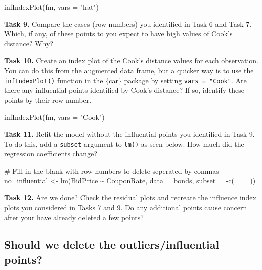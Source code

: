\documentclass[
  letterpaper,
  DIV=11,
  numbers=noendperiod]{scrartcl}
\newenvironment{Shaded}{\begin{snugshade}}{\end{snugshade}}
\newcommand{\AttributeTok}[1]{\textcolor[rgb]{0.40,0.45,0.13}{#1}}
\newcommand{\CommentTok}[1]{\textcolor[rgb]{0.37,0.37,0.37}{#1}}
\newcommand{\FunctionTok}[1]{\textcolor[rgb]{0.28,0.35,0.67}{#1}}
\newcommand{\NormalTok}[1]{\textcolor[rgb]{0.00,0.23,0.31}{#1}}
\newcommand{\OtherTok}[1]{\textcolor[rgb]{0.00,0.23,0.31}{#1}}
\newcommand{\SpecialCharTok}[1]{\textcolor[rgb]{0.37,0.37,0.37}{#1}}
\newcommand{\StringTok}[1]{\textcolor[rgb]{0.13,0.47,0.30}{#1}}
\begin{document}
\begin{Shaded}
\begin{Highlighting}[]
\FunctionTok{infIndexPlot}\NormalTok{(fm, }\AttributeTok{vars =} \StringTok{"hat"}\NormalTok{)}
\end{Highlighting}
\end{Shaded}

\textbf{Task 9.} Compare the cases (row numbers) you identified in Task
6 and Task 7. Which, if any, of these points to you expect to have high
values of Cook's distance? Why?

\textbf{Task 10.} Create an index plot of the Cook's distance values for
each observation. You can do this from the augmented data frame, but a
quicker way is to use the \texttt{infIndexPlot()} function in the
\{car\} package by setting \texttt{vars\ =\ "Cook"}. Are there any
influential points identified by Cook's distance? If so, identify these
points by their row number.

\begin{Shaded}
\begin{Highlighting}[]
\FunctionTok{infIndexPlot}\NormalTok{(fm, }\AttributeTok{vars =} \StringTok{"Cook"}\NormalTok{)}
\end{Highlighting}
\end{Shaded}

\textbf{Task 11.} Refit the model without the influential points you
identified in Task 9. To do this, add a \texttt{subset} argument to
\texttt{lm()} as seen below. How much did the regression coefficients
change?

\begin{Shaded}
\begin{Highlighting}[]
\CommentTok{\# Fill in the blank with row numbers to delete seperated by commas}
\NormalTok{no\_influential }\OtherTok{\textless{}{-}} \FunctionTok{lm}\NormalTok{(BidPrice }\SpecialCharTok{\textasciitilde{}}\NormalTok{ CouponRate, }\AttributeTok{data =}\NormalTok{ bonds, }\AttributeTok{subset =} \SpecialCharTok{{-}}\FunctionTok{c}\NormalTok{(\_\_\_))}
\end{Highlighting}
\end{Shaded}

\textbf{Task 12.} Are we done? Check the residual plots and recreate the
influence index plots you considered in Tasks 7 and 9. Do any additional
points cause concern after your have already deleted a few points?

\hypertarget{should-we-delete-the-outliersinfluential-points}{%
\subsection{Should we delete the outliers/influential
points?}\label{should-we-delete-the-outliersinfluential-points}}
\end{document}
